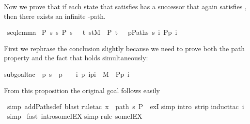 \begin{isabellebody}
\begin{isamarkuptext}
Now we prove that if each state  that satisfies 
has a successor that again satisfies , then there exists an infinite -path.%
\end{isamarkuptext}%
\ seq{\isacharunderscore}lemma{\isacharcolon}\isanewline
{\isachardoublequote}{\isasymlbrakk}\ P\ s{\isacharsemicolon}\ {\isasymforall}s{\isachardot}\ P\ s\ {\isasymlongrightarrow}\ {\isacharparenleft}{\isasymexists}\ t{\isachardot}\ {\isacharparenleft}s{\isacharcomma}t{\isacharparenright}{\isasymin}M\ {\isasymand}\ P\ t{\isacharparenright}\ {\isasymrbrakk}\ {\isasymLongrightarrow}\ {\isasymexists}p{\isasymin}Paths\ s{\isachardot}\ {\isasymforall}i{\isachardot}\ P{\isacharparenleft}p\ i{\isacharparenright}{\isachardoublequote}%
\begin{isamarkuptxt}%
\noindent
First we rephrase the conclusion slightly because we need to prove both the path property
and the fact that  holds simultaneously:%
\end{isamarkuptxt}%
subgoal{\isacharunderscore}tac\ {\isachardoublequote}{\isasymexists}\ p{\isachardot}\ s\ {\isacharequal}\ p\ \ {\isasymand}\ {\isacharparenleft}{\isasymforall}\ i{\isachardot}\ {\isacharparenleft}p\ i{\isacharcomma}p{\isacharparenleft}i{\isacharplus}\ {\isasymin}\ M\ {\isasymand}\ P{\isacharparenleft}p\ i{\isacharparenright}{\isacharparenright}{\isachardoublequote}{\isacharparenright}%
\begin{isamarkuptxt}%
\noindent
From this proposition the original goal follows easily%
\end{isamarkuptxt}%
\ simp\ add{\isacharcolon}Paths{\isacharunderscore}def{\isacharcomma}\ blast{\isacharparenright}\isanewline
{}rule{\isacharunderscore}tac\ x\ {\isacharequal}\ {\isachardoublequote}path\ s\ P{\isachardoublequote}\ \ exI{\isacharparenright}\isanewline
{}simp{\isacharparenright}\isanewline
{}intro\ strip{\isacharparenright}\isanewline
{}induct{\isacharunderscore}tac\ i{\isacharparenright}\isanewline
\ simp{\isacharparenright}\isanewline
\ fast\ intro{\isacharcolon}someIEX{\isacharparenright}\isanewline
{}simp{\isacharparenright}\isanewline
{}rule\ someIEX{\isacharparenright}\isanewline

\end{isabellebody}
